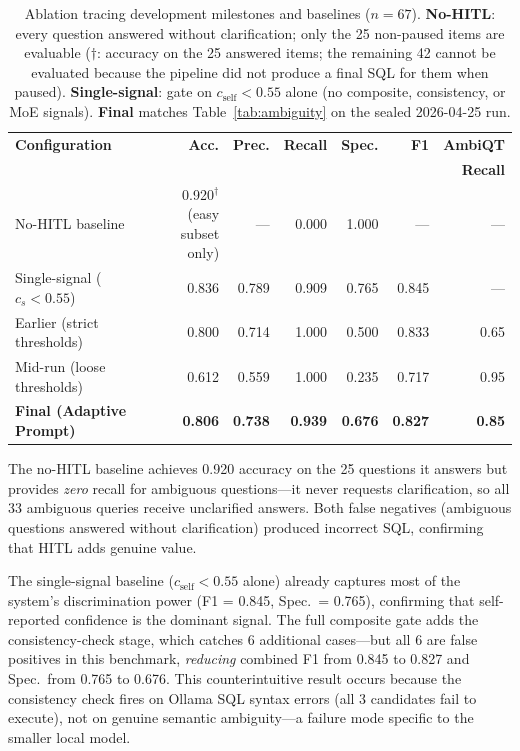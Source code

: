 \documentclass{article}
\begin{document}
\begin{table}[h]
\centering
\caption{Ablation tracing development milestones and baselines ($n{=}67$).
  \textbf{No-HITL}: every question answered without clarification; only the 25
  non-paused items are evaluable ($\dagger$: accuracy on the 25 answered items;
  the remaining 42 cannot be evaluated because the pipeline did not produce a
  final SQL for them when paused).
  \textbf{Single-signal}: gate on $c_{\text{self}} < 0.55$ alone (no composite,
  consistency, or MoE signals).
  \textbf{Final} matches Table~\ref{tab:ambiguity} on the sealed 2026-04-25 run.}
\label{tab:ablation}
\small
\begin{tabular}{lrrrrrr}
\toprule
\textbf{Configuration} & \textbf{Acc.} & \textbf{Prec.} & \textbf{Recall}
  & \textbf{Spec.} & \textbf{F1} & \textbf{AmbiQT}\\
  &&&&&&  \textbf{Recall} \\
\midrule
No-HITL baseline        & 0.920$^\dagger$ \scriptsize{(easy subset only)} & ---   & 0.000 & 1.000 & ---   & --- \\
Single-signal ($c_s{<}0.55$) & 0.836 & 0.789 & 0.909 & 0.765 & 0.845 & --- \\
\midrule
Earlier (strict thresholds)     & 0.800 & 0.714 & 1.000 & 0.500 & 0.833 & 0.65 \\
Mid-run (loose thresholds)      & 0.612 & 0.559 & 1.000 & 0.235 & 0.717 & 0.95 \\
\textbf{Final (Adaptive Prompt)}& \textbf{0.806} & \textbf{0.738} & \textbf{0.939} & \textbf{0.676} & \textbf{0.827} & \textbf{0.85} \\
\bottomrule
\end{tabular}
\end{table}

The no-HITL baseline achieves 0.920 accuracy on the 25 questions it answers but
provides \emph{zero} recall for ambiguous questions---it never requests
clarification, so all 33 ambiguous queries receive unclarified answers.
Both false negatives (ambiguous questions answered without clarification)
produced incorrect SQL, confirming that HITL adds genuine value.

The single-signal baseline ($c_{\text{self}} < 0.55$ alone) already captures
most of the system's discrimination power (F1 = 0.845, Spec.~= 0.765),
confirming that self-reported confidence is the dominant signal.
The full composite gate adds the consistency-check stage, which
catches 6 additional cases---but all 6 are false positives in this benchmark,
\emph{reducing} combined F1 from 0.845 to 0.827 and Spec.~from 0.765 to 0.676.
This counterintuitive result occurs because the consistency check fires
on Ollama SQL syntax errors (all 3 candidates fail to execute),
not on genuine semantic ambiguity---a failure mode specific to the
smaller local model.
\end{document}
